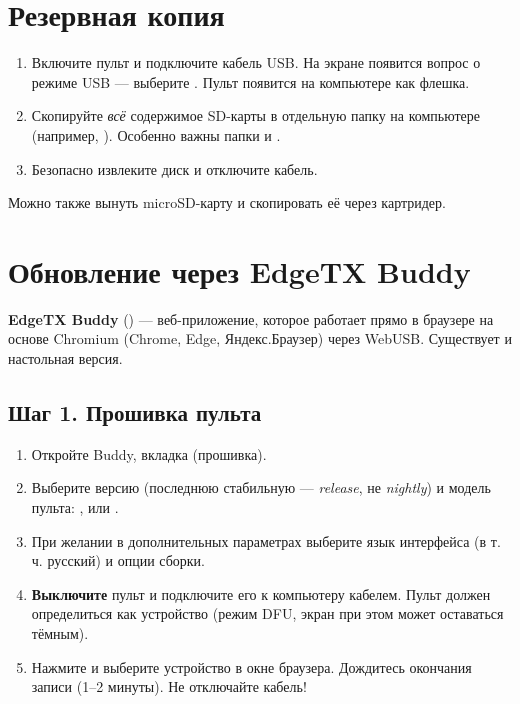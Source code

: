 \section{Резервная копия}

\begin{enumerate}
  \item Включите пульт и подключите кабель USB. На экране появится вопрос о режиме USB ---
        выберите . Пульт появится на компьютере как флешка.
  \item Скопируйте \emph{всё} содержимое SD-карты в отдельную папку на компьютере
        (например, ). Особенно важны папки  и .
  \item Безопасно извлеките диск и отключите кабель.
\end{enumerate}

Можно также вынуть microSD-карту и скопировать её через картридер.

\section{Обновление через EdgeTX Buddy}

\textbf{EdgeTX Buddy} () --- веб-приложение, которое работает прямо в
браузере на основе Chromium (Chrome, Edge, Яндекс.Браузер) через WebUSB. Существует и
настольная версия.

\subsection{Шаг 1. Прошивка пульта}

\begin{enumerate}
  \item Откройте Buddy, вкладка  (прошивка).
  \item Выберите версию (последнюю стабильную --- \emph{release}, не \emph{nightly})
        и модель пульта: ,  или
        .
  \item При желании в дополнительных параметрах выберите язык интерфейса (в т.\,ч. русский)
        и опции сборки.
  \item \textbf{Выключите} пульт и подключите его к компьютеру кабелем. Пульт должен определиться
        как устройство  (режим DFU, экран при этом может оставаться
        тёмным).
  \item Нажмите  и выберите устройство в окне браузера. Дождитесь окончания
        записи (1--2 минуты). Не отключайте кабель!
\end{enumerate}

